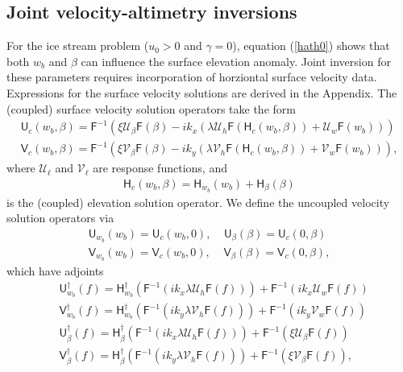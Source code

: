 \documentclass[paper=a4, fontsize=11pt]{article}
\begin{document}
\subsection*{Joint velocity-altimetry inversions}
For the ice stream problem ($u_0>0$ and $\gamma=0$), equation (\ref{hath0})
shows that both $w_b$ and $\beta$ can influence the surface elevation anomaly.
Joint inversion for these parameters requires incorporation of horziontal surface
velocity data. Expressions for the surface velocity solutions are derived
in the Appendix. The (coupled) surface velocity solution operators take the form
\begin{align}
\mathsf{U}_c(w_b,\beta) =  \mathsf{F}^{-1}(\xi\mathcal{U}_{\beta} \mathsf{F}({\beta}) -ik_x\left(\lambda\mathcal{U}_h\mathsf{F}( \mathsf{H}_c(w_b,\beta) ) +  \mathcal{U}_w\mathsf{F}(w_b)\right)) \label{U}\\
\mathsf{V}_c(w_b,\beta) =  \mathsf{F}^{-1}(\xi\mathcal{V}_{\beta} \mathsf{F}({\beta}) -ik_y\left(\lambda\mathcal{V}_h\mathsf{F}( \mathsf{H}_c(w_b,\beta) ) +  \mathcal{V}_w\mathsf{F}(w_b)\right))\label{V},
\end{align}
where $\mathcal{U}_\ell$ and $\mathcal{V}_\ell$ are response functions, and
\begin{align}
\mathsf{H}_c(w_b,\beta) = \mathsf{H}_{w_b}(w_b) + \mathsf{H}_{\beta}(\beta)
\end{align}
is the (coupled) elevation solution operator.
We define the uncoupled velocity solution operators via
\begin{align}
\mathsf{U}_{w_b} (w_b) = \mathsf{U}_c(w_b,0), \;\;\;\; \mathsf{U}_{\beta} (\beta) = \mathsf{U}_c(0,\beta) \\
\mathsf{V}_{w_b} (w_b) = \mathsf{V}_c(w_b,0), \;\;\;\; \mathsf{V}_{\beta} (\beta) = \mathsf{V}_c(0,\beta),
\end{align}
which have adjoints
\begin{align}
&\mathsf{U}_{w_b}^\dagger (f) =
\mathsf{H}_{w_b}^{\dagger}(\mathsf{F}^{-1}( ik_x\lambda\mathcal{U}_h\mathsf{F}( f )))
+  \mathsf{F}^{-1}(ik_x{\mathcal{U}_w}\mathsf{F}(f)) \\
&\mathsf{V}_{w_b}^\dagger (f) =
\mathsf{H}_{w_b}^{\dagger}(\mathsf{F}^{-1}( ik_y\lambda\mathcal{V}_h\mathsf{F}( f )))
+  \mathsf{F}^{-1}(ik_y{\mathcal{V}_w}\mathsf{F}(f))\\
&\mathsf{U}_{\beta}^\dagger (f) =
\mathsf{H}_{\beta}^{\dagger}(\mathsf{F}^{-1}( ik_x\lambda\mathcal{U}_h\mathsf{F}( f )))
+  \mathsf{F}^{-1}(\xi{\mathcal{U}_\beta}\mathsf{F}(f)) \\
&\mathsf{V}_{\beta}^\dagger (f) =
\mathsf{H}_{\beta}^{\dagger}(\mathsf{F}^{-1}( ik_y\lambda\mathcal{V}_h\mathsf{F}( f )))
+  \mathsf{F}^{-1}(\xi{\mathcal{V}_\beta}\mathsf{F}(f)),
\end{align}
\end{document}
